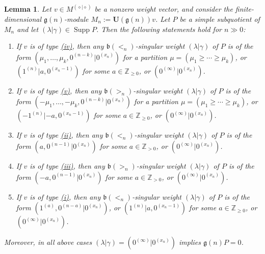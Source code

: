 \documentclass[12pt]{amsart}
\newcommand\Z{\mathbb{Z}}
\newcommand\g{\mathfrak{g}}
\newcommand\fb{\mathfrak{b}}
\newcommand\bU{\mathbf{U}}
\DeclareMathOperator{\Supp}{Supp} %
\theoremstyle{plain}
\newtheorem{lem}[theo]{Lemma}
\theoremstyle{definition}
\numberwithin{equation}{section}
\begin{document}
\begin{lem}\label{lem:possible.h.w}
Let $v\in M^{(\diamond | \diamond)}$ be a nonzero weight vector, and consider the finite-dimensional $\g(n)$-module $M_n := \bU(\g(n)) v$. Let $P$ be a simple subquotient of $M_n$ and let $(\lambda | \gamma)\in \Supp P$. Then the following statements hold for $n\gg 0$:
\begin{enumerate}
\item If $v$ is of type {\rm \hyperref[list:types.of.weights.schur.dual]{(iv)}}, then any $\fb(<_n)$-singular weight $(\lambda | \gamma)$ of $P$ is of the form \linebreak[4] $(\mu_1,\ldots,\mu_k,0^{(n-k)}|0^{(x_n)})$ for a partition $\mu = (\mu_1\geq \cdots \geq \mu_k)$, or $(1^{(n)}|a, 0^{(x_n-1)})$ for some $a\in \Z_{\geq 0}$, or $(0^{(\infty)}| 0^{(x_n)})$.
\item If $v$ is of type {\rm \hyperref[list:types.of.weights.schur]{(v)}}, then any $\fb(>_n)$-singular weight  $(\lambda | \gamma)$ of $P$ is of the form \linebreak[4] $(-\mu_1,\ldots,-\mu_k,0^{(n-k)}|0^{(x_n)})$ for a partition $\mu = (\mu_1\geq \cdots \geq \mu_k)$, or $(-1^{(n)}|-a, 0^{(x_n-1)})$ for some $a\in \Z_{\geq 0}$, or $(0^{(\infty)}| 0^{(x_n)})$.
\item  If $v$ is of type {\rm \hyperref[list:types.of.weights.symmetric]{(ii)}}, then any $\fb(<_n)$-singular weight $(\lambda | \gamma)$ of $P$ is of the form \linebreak[4] $(a,0^{(n-1)} | 0^{(x_n)})$ for some $a\in \Z_{>0}$, or $(0^{(\infty)}| 0^{(x_n)})$.
\item If $v$ is of type {\rm \hyperref[list:types.of.weights.symmetric]{(iii)}}, then any $\fb(>_n)$-singular weight $(\lambda | \gamma)$ of $P$ is of the form \linebreak[4] $(-a,0^{(n-1)} | 0^{(x_n)})$ for some $a\in \Z_{>0}$, or $(0^{(\infty)}| 0^{(x_n)})$.
\item  If $v$ is of type {\rm \hyperref[list:types.of.weights.exterior]{(i)}}, then any $\fb(<_n)$-singular weight $(\lambda | \gamma)$ of $P$ is of the form \linebreak[4] $(1^{(a)}, 0^{(n-a)}|0^{(x_n)})$, or $(1^{(n)}|a, 0^{(x_n-1)})$ for some $a\in \Z_{\geq 0}$, or $(0^{(\infty)}| 0^{(x_n)})$.
\end{enumerate}
Moreover, in all above cases $(\lambda | \gamma) = (0^{(\infty)}| 0^{(x_n)})$ implies $\g(n)P=0$.
\end{lem}
\end{document}
